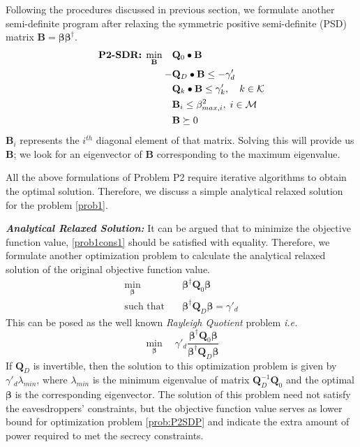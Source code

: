 \documentclass[journal,,draftclsnofoot letterpaper, onecolumn]{IEEEtran}
\begin{document}
Following the procedures discussed in previous section, we formulate another semi-definite program after relaxing the 
symmetric positive semi-definite (PSD) matrix $\mathbf{B}=\bm{\beta\beta}^\dagger$.
\begin{subequations}
\label{prob:P2SDP}            
\begin{align}
\text{\textbf{P2-SDR:}}\;\min_\mathbf{B} \quad &  {\mathbf{Q}}_0 \bullet {\mathbf{B}} \\
    -& {\mathbf{Q}}_D \bullet {\mathbf{B}} \le -\gamma'_d\\
    & {\mathbf{Q}}_k \bullet {\mathbf{B}} \le \gamma'_k,\quad k \in  \mathcal{K}\\&\mathbf{B}_i \le \beta_{max,i}^2, \; i \in \mathcal{M}\\ & {\mathbf{B}} \succeq 0
\end{align} 
\end{subequations}
 $\mathbf{B}_i$ represents the $i^{th}$ diagonal element of that matrix. Solving this will provide us $\mathbf{B}$; we look for an eigenvector of $\mathbf{B}$ corresponding to the maximum eigenvalue. 

All the above formulations of Problem P2 require iterative algorithms to obtain the optimal solution. Therefore, we discuss a simple analytical relaxed solution for the problem \eqref{prob1}.

\textit{\textbf{Analytical Relaxed Solution:}} It can be argued that to minimize the objective function value, \eqref{prob1cons1} should be satisfied with equality. Therefore, we formulate another optimization problem to calculate the analytical relaxed solution of the original objective function value.
\begin{subequations}
\begin{align}
\min_{\bm{\beta}}\quad& \bm{\beta}^\dagger\mathbf{Q}_0\bm{\beta} \\
\text{such that}\quad & \bm{\beta}^\dagger\mathbf{Q}_D\bm{\beta}=\gamma'_d
\end{align} 
\end{subequations}
This can be posed as the well known \textit{Rayleigh Quotient} \cite[p.~176]{Horn1985} problem \textit{i.e.}
\begin{equation}
\label{eq:rayleigh}
\min_{\bm{\beta}}\quad  \gamma'_d\frac{\bm{\beta}^\dagger\mathbf{Q}_0\bm{\beta}}{\bm{\beta}^\dagger\mathbf{Q}_D\bm{\beta}} 
\end{equation}
If $\mathbf{Q}_D$ is invertible, then the solution to this optimization problem is given by $\gamma'_d\lambda_{min}$, where $\lambda_{min}$ is the minimum eigenvalue of matrix $\mathbf{Q}^{-1}_D\mathbf{Q}_0$ and the optimal $\bm{\beta}$ is the corresponding eigenvector. The solution of this problem need not satisfy the eavesdroppers' constraints, but the objective function value serves as lower bound for optimization problem \ref{prob:P2SDP} and indicate the extra amount of power required to met the secrecy constraints.
\end{document}
